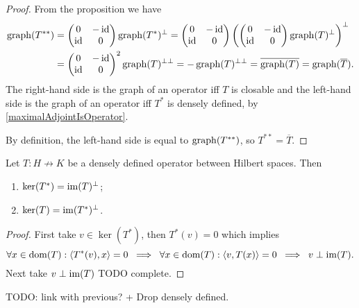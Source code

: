 \begin{proof}
From the proposition we have
\begin{align*}
\operatorname{graph}(T^{**}) &=  \begin{pmatrix}
0 & -\operatorname{id} \\ \operatorname{id} & 0
\end{pmatrix}\operatorname{graph}(T^*)^\perp 
=  \begin{pmatrix}
0 & -\operatorname{id} \\ \operatorname{id} & 0
\end{pmatrix}\left(\begin{pmatrix}
0 & -\operatorname{id} \\ \operatorname{id} & 0
\end{pmatrix}\operatorname{graph}(T)^\perp\right)^\perp \\
&= \begin{pmatrix}
0 & -\operatorname{id} \\ \operatorname{id} & 0
\end{pmatrix}^2\operatorname{graph}(T)^{\perp\perp} = -\operatorname{graph}(T)^{\perp\perp}
= \overline{\operatorname{graph}(T)} = \operatorname{graph}(\overline{T}).
\end{align*}
The right-hand side is the graph of an operator iff $T$ is closable and the left-hand side is the graph of an operator iff $T^*$ is densely defined, by \ref{maximalAdjointIsOperator}.

By definition, the left-hand side is equal to $\operatorname{graph}(T^{**})$, so $T^{**} = \overline{T}$.
\end{proof}

\begin{proposition} \label{kernelImageAdjoint}
Let $T: H\not\to K$ be a densely defined operator between Hilbert spaces. Then
\begin{enumerate}
\item $\ker(T^*) = \operatorname{im}(T)^\perp$;
\item $\ker(T) = \operatorname{im}(T^*)^\perp$.
\end{enumerate}
\end{proposition}
\begin{proof}
First take $v\in \ker(T^*)$, then $T^*(v) = 0$ which implies
\[ \forall x \in\operatorname{dom}(T): \left\langle T^*(v), x \right\rangle = 0 \;\implies\; \forall x \in\operatorname{dom}(T): \left\langle v, T(x) \right\rangle = 0 \;\implies\; v\perp \operatorname{im}(T).  \]
Next take $v\perp \operatorname{im}(T)$ TODO complete.
\end{proof}
TODO: link with previous? + Drop densely defined.

